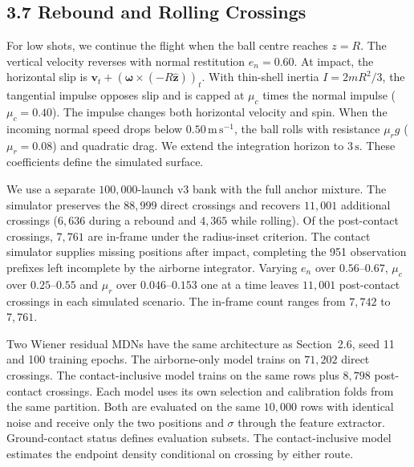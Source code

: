 \subsection{3.7 Rebound and Rolling Crossings}

For low shots, we continue the flight when the ball centre reaches $z=R$. The vertical velocity reverses with normal restitution $e_n=0.60$. At impact, the horizontal slip is $\mathbf v_t+(\boldsymbol\omega\times(-R\hat{\mathbf z}))_t$. With thin-shell inertia $I=2mR^2/3$, the tangential impulse opposes slip and is capped at $\mu_c$ times the normal impulse ($\mu_c=0.40$). The impulse changes both horizontal velocity and spin. When the incoming normal speed drops below $0.50\,\mathrm{m\,s^{-1}}$, the ball rolls with resistance $\mu_r g$ ($\mu_r=0.08$) and quadratic drag. We extend the integration horizon to $3\,\mathrm{s}$. These coefficients define the simulated surface.

We use a separate $100{,}000$-launch v3 bank with the full anchor mixture. The simulator preserves the $88{,}999$ direct crossings and recovers $11{,}001$ additional crossings ($6{,}636$ during a rebound and $4{,}365$ while rolling). Of the post-contact crossings, $7{,}761$ are in-frame under the radius-inset criterion. The contact simulator supplies missing positions after impact, completing the 951 observation prefixes left incomplete by the airborne integrator. Varying $e_n$ over $0.56$--$0.67$, $\mu_c$ over $0.25$--$0.55$ and $\mu_r$ over $0.046$--$0.153$ one at a time leaves $11{,}001$ post-contact crossings in each simulated scenario. The in-frame count ranges from $7{,}742$ to $7{,}761$.

Two Wiener residual MDNs have the same architecture as Section~2.6, seed 11 and 100 training epochs. The airborne-only model trains on $71{,}202$ direct crossings. The contact-inclusive model trains on the same rows plus $8{,}798$ post-contact crossings. Each model uses its own selection and calibration folds from the same partition. Both are evaluated on the same $10{,}000$ rows with identical noise and receive only the two positions and $\sigma$ through the feature extractor. Ground-contact status defines evaluation subsets. The contact-inclusive model estimates the endpoint density conditional on crossing by either route.

